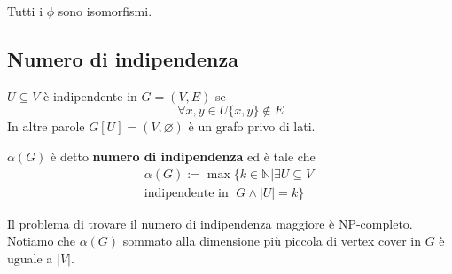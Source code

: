 \documentclass[12pt]{report}
\begin{document}
\noindent
Tutti i $\phi$ sono isomorfismi.

\subsection{Numero di indipendenza}

\begin{defi}
    $U \subseteq V$ è indipendente in $G = (V,E)$ se $$\forall x,y \in U \{x,y\} \notin E$$
    In altre parole $G[U] = (V,\varnothing)$ è un grafo privo di lati.
\end{defi}

\begin{defi}
    $\alpha(G)$ è detto \textbf{numero di indipendenza} ed è tale che
    \begin{multline*}
    \alpha(G) := \max\{k \in \mathbb{N} | \exists U \subseteq V \; \\ \text{indipendente in }\;  G  \land |U|= k \}
    \end{multline*}

\end{defi}

\noindent
Il problema di trovare il numero di indipendenza maggiore è NP-completo.  Notiamo che $\alpha(G)$ sommato alla dimensione più piccola di vertex cover in $G$ è uguale a $|V|$.

\end{document}
